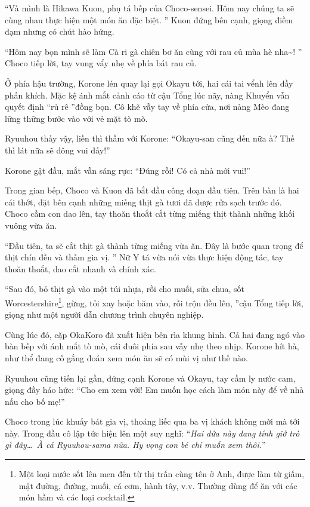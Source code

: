 \documentclass[../main.tex]{subfiles}
\begin{document}
``Và mình là Hikawa Kuon, phụ tá bếp của Choco-sensei. Hôm nay chúng ta sẽ cùng nhau thực hiện một món ăn đặc biệt. '' Kuon đứng bên cạnh, giọng điềm đạm nhưng có chút hào hứng.

``Hôm nay bọn mình sẽ làm Cà ri gà chiên bơ ăn cùng với rau củ mùa hè nha\~{}! '' Choco tiếp lời, tay vung vẩy nhẹ về phía bát rau củ.

Ở phía hậu trường, Korone lén quay lại gọi Okayu tới, hai cái tai vểnh lên đầy phấn khích. Mặc kệ ánh mắt cảnh cáo từ cậu Tổng lúc nãy, nàng Khuyển vẫn quyết định ``rủ rê ''đồng bọn. Cô khẽ vẫy tay về phía cửa, nơi nàng Mèo đang lững thững bước vào với vẻ mặt tò mò.

Ryuuhou thấy vậy, liền thì thầm với Korone: ``Okayu-san cũng đến nữa à? Thế thì lát nữa sẽ đông vui đấy!''

Korone gật đầu, mắt vẫn sáng rực: ``Đúng rồi! Có cả nhà mới vui!''


Trong gian bếp, Choco và Kuon đã bắt đầu công đoạn đầu tiên. Trên bàn là hai cái thớt, đặt bên cạnh những miếng thịt gà tươi đã được rửa sạch trước đó. Choco cầm con dao lên, tay thoăn thoắt cắt từng miếng thịt thành những khối vuông vừa ăn.

``Đầu tiên, ta sẽ cắt thịt gà thành từng miếng vừa ăn. Đây là bước quan trọng để thịt chín đều và thấm gia vị. '' Nữ Y tá vừa nói vừa thực hiện động tác, tay thoăn thoắt, dao cắt nhanh và chính xác.

``Sau đó, bỏ thịt gà vào một túi nhựa, rồi cho muối, sữa chua, sốt Worcestershire\footnote{Một loại nước sốt lên men đến từ thị trấn cùng tên ở Anh, được làm từ giấm, mật đường, đường, muối, cá cơm, hành tây, v.v. Thường dùng để ăn với các món hầm và các loại cocktail.}, gừng, tỏi xay hoặc băm vào, rồi trộn đều lên, ''cậu Tổng tiếp lời, giọng như một người dẫn chương trình chuyên nghiệp.

Cùng lúc đó, cặp OkaKoro đã xuất hiện bên rìa khung hình. Cả hai đang ngó vào bàn bếp với ánh mắt tò mò, cái đuôi phía sau vẫy nhẹ theo nhịp. Korone hít hà, như thể đang cố gắng đoán xem món ăn sẽ có mùi vị như thế nào.

Ryuuhou cũng tiến lại gần, đứng cạnh Korone và Okayu, tay cầm ly nước cam, giọng đầy háo hức: ``Cho em xem với! Em muốn học cách làm món này để về nhà nấu cho bố mẹ!''

Choco trong lúc khuấy bát gia vị, thoáng liếc qua ba vị khách không mời mà tới này. Trong đầu cô lập tức hiện lên một suy nghĩ: ``\textit{Hai đứa này đang tính giở trò gì đây\dots\ À cả Ryuuhou-sama nữa. Hy vọng con bé chỉ muốn xem thôi.}''
\end{document}
